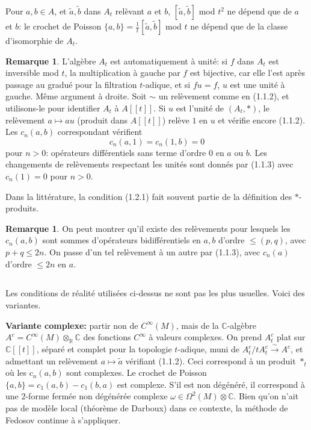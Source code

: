 \documentclass[11pt,a4paper]{article}
\theoremstyle{plain}
\theoremstyle{definition}
\newtheorem{remark}[theorem]{Remarque}
\newcommand{\R}{\mathbb{R}}
\newcommand{\C}{\mathbb{C}}
\newcommand{\iso}{\xrightarrow{\sim}}
\begin{document}
Pour $a, b \in A$, et $\tilde{a}, \tilde{b}$ dans $A_{t}$ rel\`evant $a$ et $b$, $[\tilde{a}, \tilde{b}]$ mod $t^{2}$ ne d\'epend que
de $a$ et $b$: le crochet de Poisson $\{a, b\} = \frac{1}{t}[\tilde{a}, \tilde{b}]$ mod $t$ ne d\'epend que de la classe
d'isomorphie de $A_{t}$.

\begin{remark}
L'alg\`ebre $A_{t}$ est automatiquement \`a unit\'e: si $f$ dans $A_{t}$ est inversible mod $t$, la multiplication \`a gauche par $f$ est bijective, car elle l'est apr\`es passage
au gradu\'e pour la filtration $t$-adique, et si $fu = f$, $u$ est une unit\'e \`a gauche. M\^eme
argument \`a droite. Soit $\sim$ un rel\`evement comme en (1.1.2), et utilisons-le pour
identifier $A_{t}$ \`a $A[[t]]$. Si $u$ est l'unit\'e de $(A_{t}, *)$, le rel\`evement $a \mapsto au$ (produit dans
$A[[t]]$) rel\`eve $1$ en $u$ et v\'erifie encore (1.1.2). Les $c_{n}(a, b)$ correspondant v\'erifient
\begin{equation}
c_{n}(a, 1) = c_{n}(1, b) = 0 \tag{1.2.1}
\end{equation}
pour $n > 0$: op\'erateurs diff\'erentiels sans terme d'ordre $0$ en $a$ ou $b$. Les changements
de rel\`evements respectant les unit\'es sont donn\'es par (1.1.3) avec $c_{n}(1) = 0$ pour
$n > 0$.

Dans la litt\'erature, la condition (1.2.1) fait souvent partie de la d\'efinition des
$*$-produits.
\end{remark}

\begin{remark}
On peut montrer qu'il existe des rel\`evements pour lesquels les
$c_{n}(a, b)$ sont sommes d'op\'erateurs bidiff\'erentiels en $a, b$ d'ordre $\leq (p,q)$, avec $p + q \leq 2n$. On passe d'un tel rel\`evement \`a un autre par (1.1.3), avec $c_{n}(a)$ d'ordre $\leq 2n$
en $a$.
\end{remark}

\subsection{}
Les conditions de r\'ealit\'e utilis\'ees ci-dessus ne sont pas les plus usuelles. Voici
des variantes.

\textbf{Variante complexe:} partir non de $C^{\infty}(M)$, mais de la $\C$-alg\`ebre $A^{c} = C^{\infty}(M) \otimes_{\R} \C$
des fonctions $C^{\infty}$ \`a valeurs complexes. On prend $A_{t}^{c}$ plat sur $\C[[t]]$, s\'epar\'e et
complet pour la topologie $t$-adique, muni de $A_{t}^{c}/tA_{t}^{c} \iso A^{c}$, et admettant un
rel\`evement $a \mapsto \tilde{a}$ v\'erifiant (1.1.2). Ceci correspond \`a un produit $*_{t}$ o\`u les $c_{n}(a, b)$
sont complexes. Le crochet de Poisson $\{a,b\} = c_{1}(a,b) - c_{1}(b,a)$ est complexe.
S'il est non d\'eg\'en\'er\'e, il correspond \`a une $2$-forme ferm\'ee non d\'eg\'en\'er\'ee complexe
$\omega \in \Omega^{2}(M) \otimes \C$. Bien qu'on n'ait pas de mod\`ele local (th\'eor\`eme de Darboux) dans
ce contexte, la m\'ethode de Fedosov continue \`a s'appliquer.
\end{document}
